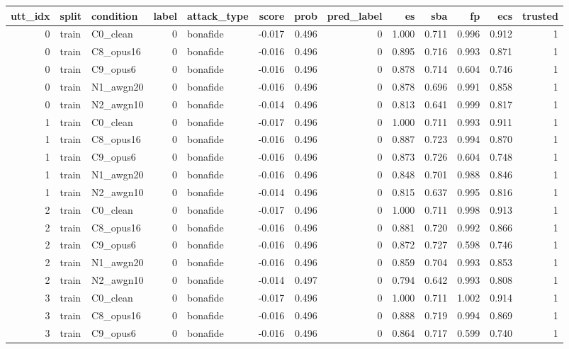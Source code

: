\begin{tabular}{rllrlrrrrrrrr}
\toprule
utt_idx & split & condition & label & attack_type & score & prob & pred_label & es & sba & fp & ecs & trusted \\
\midrule
0 & train & C0_clean & 0 & bonafide & -0.017 & 0.496 & 0 & 1.000 & 0.711 & 0.996 & 0.912 & 1 \\
0 & train & C8_opus16 & 0 & bonafide & -0.016 & 0.496 & 0 & 0.895 & 0.716 & 0.993 & 0.871 & 1 \\
0 & train & C9_opus6 & 0 & bonafide & -0.016 & 0.496 & 0 & 0.878 & 0.714 & 0.604 & 0.746 & 1 \\
0 & train & N1_awgn20 & 0 & bonafide & -0.016 & 0.496 & 0 & 0.878 & 0.696 & 0.991 & 0.858 & 1 \\
0 & train & N2_awgn10 & 0 & bonafide & -0.014 & 0.496 & 0 & 0.813 & 0.641 & 0.999 & 0.817 & 1 \\
1 & train & C0_clean & 0 & bonafide & -0.017 & 0.496 & 0 & 1.000 & 0.711 & 0.993 & 0.911 & 1 \\
1 & train & C8_opus16 & 0 & bonafide & -0.016 & 0.496 & 0 & 0.887 & 0.723 & 0.994 & 0.870 & 1 \\
1 & train & C9_opus6 & 0 & bonafide & -0.016 & 0.496 & 0 & 0.873 & 0.726 & 0.604 & 0.748 & 1 \\
1 & train & N1_awgn20 & 0 & bonafide & -0.016 & 0.496 & 0 & 0.848 & 0.701 & 0.988 & 0.846 & 1 \\
1 & train & N2_awgn10 & 0 & bonafide & -0.014 & 0.496 & 0 & 0.815 & 0.637 & 0.995 & 0.816 & 1 \\
2 & train & C0_clean & 0 & bonafide & -0.017 & 0.496 & 0 & 1.000 & 0.711 & 0.998 & 0.913 & 1 \\
2 & train & C8_opus16 & 0 & bonafide & -0.016 & 0.496 & 0 & 0.881 & 0.720 & 0.992 & 0.866 & 1 \\
2 & train & C9_opus6 & 0 & bonafide & -0.016 & 0.496 & 0 & 0.872 & 0.727 & 0.598 & 0.746 & 1 \\
2 & train & N1_awgn20 & 0 & bonafide & -0.016 & 0.496 & 0 & 0.859 & 0.704 & 0.993 & 0.853 & 1 \\
2 & train & N2_awgn10 & 0 & bonafide & -0.014 & 0.497 & 0 & 0.794 & 0.642 & 0.993 & 0.808 & 1 \\
3 & train & C0_clean & 0 & bonafide & -0.017 & 0.496 & 0 & 1.000 & 0.711 & 1.002 & 0.914 & 1 \\
3 & train & C8_opus16 & 0 & bonafide & -0.016 & 0.496 & 0 & 0.888 & 0.719 & 0.994 & 0.869 & 1 \\
3 & train & C9_opus6 & 0 & bonafide & -0.016 & 0.496 & 0 & 0.864 & 0.717 & 0.599 & 0.740 & 1 \\

\end{tabular}
